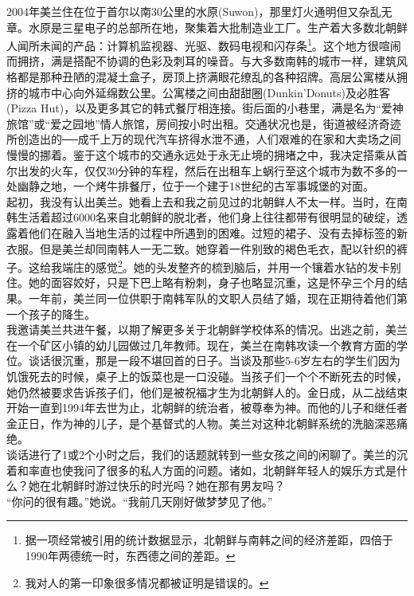 \begin{multicols}{\theparacolNo}
2004年美兰住在位于首尔以南30公里的水原(Suwon)，那里灯火通明但又杂乱无章。水原是三星电子的总部所在地，聚集着大批制造业工厂。生产着大多数北朝鲜人闻所未闻的产品：计算机监视器、光驱、数码电视和闪存条\footnote{据一项经常被引用的统计数据显示，北朝鲜与南韩之间的经济差距，四倍于1990年两德统一时，东西德之间的差距。}。这个地方很喧闹而拥挤，满是搭配不协调的色彩及刺耳的噪音。与大多数南韩的城市一样，建筑风格都是那种丑陋的混凝土盒子，房顶上挤满眼花缭乱的各种招牌。高层公寓楼从拥挤的城市中心向外延绵数公里。公寓楼之间由甜甜圈(Dunkin'Donuts)及必胜客(Pizza Hut)，以及更多其它的韩式餐厅相连接。街后面的小巷里，满是名为“爱神旅馆”或“爱之园地”情人旅馆，房间按小时出租。交通状况也是，街道被经济奇迹所创造出的──成千上万的现代汽车挤得水泄不通，人们艰难的在家和大卖场之间慢慢的挪着。鉴于这个城市的交通永远处于永无止境的拥堵之中，我决定搭乘从首尔出发的火车，仅仅30分钟的车程，然后在出租车上蜗行至这个城市为数不多的一处幽静之地，一个烤牛排餐厅，位于一个建于18世纪的古军事城堡的对面。\\

起初，我没有认出美兰。她看上去和我之前见过的北朝鲜人不太一样。当时，在南韩生活着超过6000名来自北朝鲜的脱北者，他们身上往往都带有很明显的破绽，透露着他们在融入当地生活的过程中所遇到的困难。过短的裙子、没有去掉标签的新衣服。但是美兰却同南韩人一无二致。她穿着一件别致的褐色毛衣，配以针织的裤子。这给我端庄的感觉\footnote{我对人的第一印象很多情况都被证明是错误的。}。她的头发整齐的梳到脑后，并用一个镶着水钻的发卡别住。她的面容姣好，只是下巴上略有粉刺，身子也略显沉重，这是怀孕三个月的结果。一年前，美兰同一位供职于南韩军队的文职人员结了婚，现在正期待着他们第一个孩子的降生。\\

我邀请美兰共进午餐，以期了解更多关于北朝鲜学校体系的情况。出逃之前，美兰在一个矿区小镇的幼儿园做过几年教师。现在，美兰在南韩攻读一个教育方面的学位。谈话很沉重，那是一段不堪回首的日子。当谈及那些5-6岁左右的学生们因为饥饿死去的时候，桌子上的饭菜也是一口没碰。当孩子们一个个不断死去的时候，她仍然被要求告诉孩子们，他们是被祝福才生为北朝鲜人的。金日成，从二战结束开始一直到1994年去世为止，北朝鲜的统治者，被尊奉为神。而他的儿子和继任者金正日，作为神的儿子，是个基督式的人物。美兰对这种北朝鲜系统的洗脑深恶痛绝。\\

谈话进行了1或2个小时之后，我们的话题就转到一些女孩之间的闲聊了。美兰的沉着和率直也使我问了很多的私人方面的问题。诸如，北朝鲜年轻人的娱乐方式是什么？她在北朝鲜时游过快乐的时光吗？她在那有男友吗？\\

“你问的很有趣。”她说。“我前几天刚好做梦梦见了他。”\\


\end{multicols}
